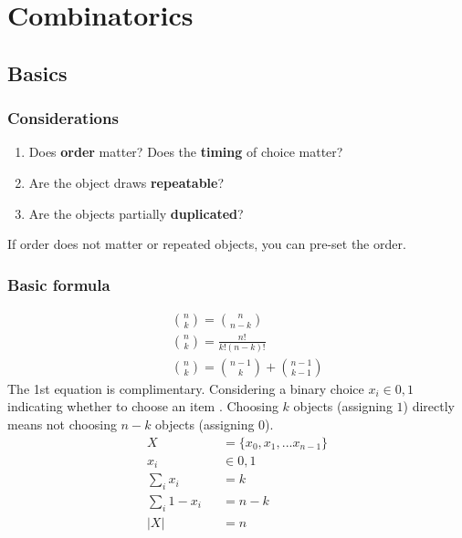 \chapter{Combinatorics}
\section{Basics}
\subsection{Considerations}
\begin{enumerate}
\item Does \textbf{order} matter? Does the \textbf{timing} of choice matter?
\item Are the object draws \textbf{repeatable}?
\item Are the objects partially \textbf{duplicated}?
\end{enumerate}
If order does not matter or repeated objects, you can pre-set the order. 
\subsection{Basic formula}
\begin{eqnarray*}
&& {n \choose k} = {n \choose n-k} \\
&& {n \choose k} = \frac{n!}{k!(n-k)!} \\
&& {n\choose k} = {n-1\choose k} + {n-1 \choose k-1}
\end{eqnarray*}
The 1st equation is complimentary. Considering a binary choice $x_i \in {0, 1}$ indicating whether to choose an item . Choosing $k$ objects (assigning $1$) directly means not choosing $n-k$ objects (assigning $0$). 
\begin{eqnarray*}
X &&= \{x_0, x_1, ... x_{n-1}\} \\
x_i &&\in {0, 1} \\
\sum_i{x_i} &&= k \\
\sum_i{1 - x_i} &&= n - k \\
|X| &&= n
\end{eqnarray*}


